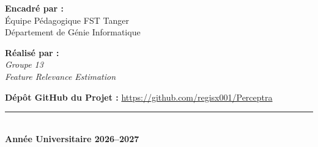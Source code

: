 \documentclass[12pt,a4paper,twoside]{report}
\begin{document}
\begin{titlepage}
  \vspace{0.45cm}

  \begin{tcolorbox}[
    colback=LightGray,
    colframe=MidGray!45,
    width=\linewidth,
    arc=4pt,
    boxrule=0.6pt,
    left=12pt,
    right=12pt,
    top=8pt,
    bottom=8pt
  ]
    \noindent
    \begin{minipage}[t]{0.48\linewidth}
      \textbf{\textcolor{PrimaryRed}{Encadré par :}}\\[0.15cm]
      Équipe Pédagogique FST Tanger\\
      Département de Génie Informatique
    \end{minipage}
    \hfill
    \begin{minipage}[t]{0.48\linewidth}
      \raggedleft
      \textbf{\textcolor{PrimaryRed}{Réalisé par :}}\\[0.15cm]
      \textit{Groupe 13}\\
      \textit{Feature Relevance Estimation}
    \end{minipage}
  \end{tcolorbox}

  \vspace{0.15cm}
  \noindent
  \textbf{\textcolor{PrimaryRed}{Dépôt GitHub du Projet :}} \href{https://github.com/regisx001/Perceptra}{https://github.com/regisx001/Perceptra}

  \vspace{0.35cm}

  \begin{center}
    \textcolor{PrimaryRed}{\rule{0.45\linewidth}{0.8pt}}\\[0.25cm]
    {\large\bfseries Année Universitaire 2026--2027}
  \end{center}
\end{titlepage}

\newpage
{}
\setcounter{page}{1}


\newpage

\tableofcontents
\newpage

\listoffigures
\newpage

\listoftables
\newpage

\setcounter{page}{1}
\end{document}
